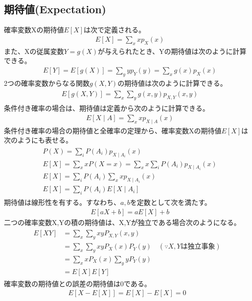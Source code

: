 \documentclass[a4j]{jarticle}
\begin{document}
\subsection{期待値(Expectation)}
確率変数Xの期待値$E[X]$は次で定義される。
\begin{align}
    &E[X]=\sum_{x}xp_{X}(x)
\end{align}
また、Xの従属変数$Y=g(X)$が与えられたとき、Yの期待値は次のように計算できる。
\begin{align}
    &E[Y]=E[g(X)]=\sum_{y}yp_{Y}(y)=\sum_{x}g(x)p_{X}(x)
\end{align}
2つの確率変数からなる関数$g(X,Y)$の期待値は次のように計算できる。
\begin{align}
    \begin{aligned}
    &E[g(X,Y)]=\sum_{x}\sum_{y}g(x,y)p_{X,Y}(x,y)
    \end{aligned}
\end{align}
条件付き確率の場合は、期待値は定義から次のように計算できる。
\begin{align}
    &E[X \mid A]=\sum_{x}xp_{X \mid A}(x)
\end{align}
条件付き確率の場合の期待値と全確率の定理から、確率変数Xの期待値$E[X]$は次のようにも表せる。
\begin{align}
    \begin{aligned}
    &P(X)=\sum_{i}P(A_{i})p_{X \mid A_{i}}(x) \\
    &E[X]=\sum_{x}xP(X=x)=\sum_{x}x\sum_{i}P(A_{i})p_{X \mid A_{i}}(x) \\
    &E[X]=\sum_{i}P(A_{i})\sum_{x}xp_{X \mid A_{i}}(x) \\
    &E[X]=\sum_{i}P(A_{i})E[X \mid A_{i}]
    \end{aligned}
\end{align}
期待値は線形性を有する。すなわち、$a,b$を定数として次を満たす。
\begin{align}
    &E[aX+b]=aE[X]+b
\end{align}
二つの確率変数X,Yの積の期待値は、X,Yが独立である場合次のようになる。
\begin{align}
    \begin{aligned}
    E[XY]&=\sum_{x}\sum_{y}xyP_{X,Y}(x,y) \\
    &=\sum_{x}\sum_{y}xyP_{X}(x)P_{Y}(y) \quad (\because X,Yは独立事象) \\
    &=\sum_{x}xP_{X}(x)\sum_{y}yP_{Y}(y) \\
    &=E[X]E[Y]
    \end{aligned}
\end{align}
確率変数の期待値との誤差の期待値は0である。
\begin{align}
    E[X-E[X]]=E[X]-E[X]=0
\end{align}
\end{document}

